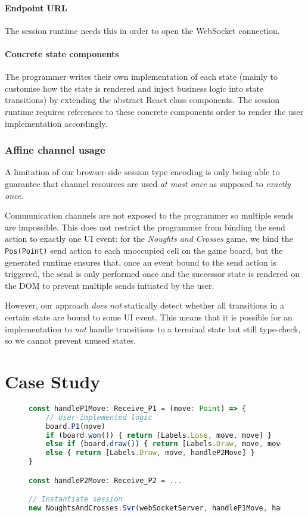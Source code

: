 \documentclass[submission,copyright,creativecommons]{eptcs}
\begin{document}
\paragraph{Endpoint URL} The session runtime needs this in order to open the WebSocket connection.

\paragraph{Concrete state components} The programmer writes their own implementation of each state (mainly to customise how the state is rendered and inject business logic into state transitions) by extending the abstract React class components. The session runtime requires references to these concrete components order to render the user implementation accordingly.

\subsubsection{Affine channel usage}
A limitation of our browser-side session type encoding is only being able to guarantee that channel resources are used \textit{at most once} as supposed to \textit{exactly once}.

Communication channels are not exposed to the programmer so multiple sends are impossible. This does not restrict the programmer from binding the send action to exactly one UI event: for the \textit{Noughts and Crosses} game, we bind the \texttt{Pos(Point)} send action to each unoccupied cell on the game board, but the generated runtime ensures that, once an event bound to the send action is triggered, the send is only performed once and the successor state is rendered on the DOM to prevent multiple sends initiated by the user.

However, our approach \textit{does not} statically detect whether all transitions in a certain state are bound to some UI event. This means that it is possible for an implementation to \textit{not} handle transitions to a terminal state but still type-check, so we cannot prevent unused states.

\section{Case Study}
\label{section:example}

\begin{figure}
\begin{lstlisting}[language=JavaScript, tabsize=4]
const handleP1Move: Receive_P1 = (move: Point) => {
	// User-implemented logic
	board.P1(move)
	if (board.won()) { return [Labels.Lose, move, move] }
	else if (board.draw()) { return [Labels.Draw, move, move] }
	else { return [Labels.Draw, move, handleP2Move] } 
}

const handleP2Move: Receive_P2 = ...

// Instantiate session
new NoughtsAndCrosses.Svr(webSocketServer, handleP1Move, handleP2Move)
\end{lstlisting}  
\label{lst:svrprotocol}
\end{figure}
\end{document}
